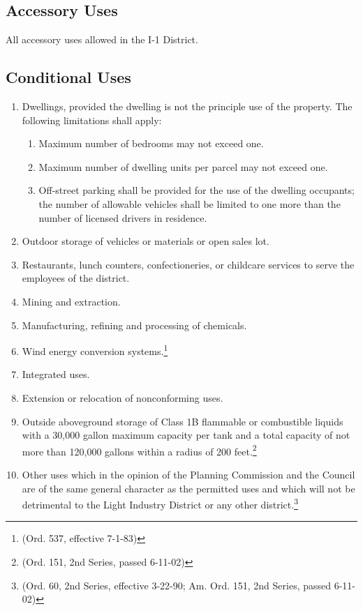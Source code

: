 \subsection{Accessory Uses}
All accessory uses allowed in the I-1 District.
\subsection{Conditional Uses}
\begin{enumerate}[{\indent}1)]
    \item Dwellings, provided the dwelling is not the principle use of the property. The following limitations shall apply:
        \begin{enumerate}
            \item Maximum number of bedrooms may not exceed one.
            \item Maximum number of dwelling units per parcel may not exceed one.
            \item Off-street parking shall be provided for the use of the dwelling occupants; the number of allowable vehicles shall be limited to one more than the number of licensed drivers in residence.
        \end{enumerate}
    \item Outdoor storage of vehicles or materials or open sales lot.
    \item Restaurants, lunch counters, confectioneries, or childcare services to serve the employees of the district.
    \item Mining and extraction.
    \item Manufacturing, refining and processing of chemicals.
    \item Wind energy conversion systems.\footnote{(Ord. 537, effective 7-1-83)}
    \item Integrated uses.
    \item Extension or relocation of nonconforming uses.
    \item  Outside aboveground storage of Class 1B flammable or combustible liquids with a 30,000 gallon maximum capacity per tank and a total capacity of not more than 120,000 gallons within a radius of 200 feet.\footnote{(Ord. 151, 2nd Series, passed 6-11-02)}
    \item Other uses which in the opinion of the Planning Commission and the Council are of the same general character as the permitted uses and which will not be detrimental to the Light Industry District or any other district.\footnote{(Ord. 60, 2nd Series, effective 3-22-90; Am. Ord. 151, 2nd Series, passed 6-11-02)}
\end{enumerate}
